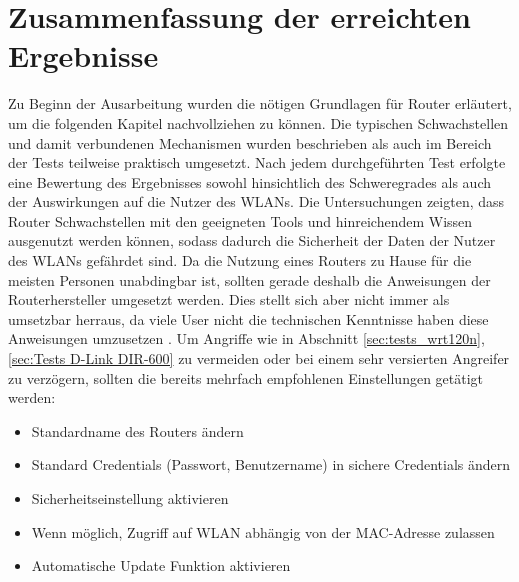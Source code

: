 	\section{Zusammenfassung der erreichten Ergebnisse}
	Zu Beginn der Ausarbeitung wurden die nötigen Grundlagen für Router erläutert, um
	die folgenden Kapitel nachvollziehen zu können. Die typischen Schwachstellen und
	damit verbundenen Mechanismen wurden beschrieben als auch im Bereich der Tests
	teilweise praktisch umgesetzt. Nach jedem durchgeführten Test erfolgte eine 
	Bewertung des Ergebnisses sowohl hinsichtlich des Schweregrades als auch der 
	Auswirkungen auf die Nutzer des WLANs. Die Untersuchungen zeigten, dass Router 
	Schwachstellen mit den geeigneten
	Tools und hinreichendem Wissen ausgenutzt werden können, sodass dadurch die
	Sicherheit der Daten der Nutzer des WLANs gefährdet sind. 
	Da die Nutzung eines Routers zu Hause für die meisten Personen unabdingbar ist,
	sollten gerade deshalb die Anweisungen der Routerhersteller umgesetzt werden. 
	Dies stellt sich aber nicht immer als umsetzbar herraus, da viele User
	nicht die technischen Kenntnisse haben diese Anweisungen umzusetzen \cite{chalhoub2023}.
	Um Angriffe wie in Abschnitt \ref{sec:tests_wrt120n}, \ref{sec:Tests D-Link DIR-600}
	zu vermeiden oder bei einem sehr versierten Angreifer zu verzögern, sollten die 
	bereits mehrfach empfohlenen Einstellungen getätigt werden:
	\begin{itemize}
		\item Standardname des Routers ändern
		\item Standard Credentials (Passwort, Benutzername) in sichere Credentials ändern
		\item Sicherheitseinstellung aktivieren
		\item Wenn möglich, Zugriff auf WLAN abhängig von der MAC-Adresse zulassen
		\item Automatische Update Funktion aktivieren
	\end{itemize}
	\cite{bsi, bsib, chalhoub2023, schwarz2021}


